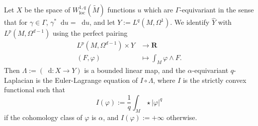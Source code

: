 \documentclass[reqno,11pt]{amsart}
\newcommand{\RR}{\mathbf{R}}
\newcommand*\dif{\mathop{}\!\mathrm{d}}
\newcommand{\loc}{\mathrm{loc}}
\theoremstyle{definition}
\numberwithin{equation}{section}
\begin{document}
Let $X$ be the space of $W^{1, q}_\loc(\tilde M)$ functions $u$ which are $\Gamma$-equivariant in the sense that for $\gamma \in \Gamma$, $\gamma^* \dif u = \dif u$, and let $Y := L^q(M, \Omega^1)$.
We identify $\hat Y$ with $L^p(M, \Omega^{d - 1})$ using the perfect pairing 
\begin{align*}
	L^p(M, \Omega^{d - 1}) \times Y &\to \RR \\
	(F, \varphi) &\mapsto \int_M \varphi \wedge F.
\end{align*}
Then $\Lambda := (\dif: X \to Y)$ is a bounded linear map, and the $\alpha$-equivariant $q$-Laplacian is the Euler-Lagrange equation of $I \circ \Lambda$, where $I$ is the strictly convex functional such that
$$I(\varphi) := \frac{1}{q} \int_M \star |\varphi|^q$$
if the cohomology class of $\varphi$ is $\alpha$, and $I(\varphi) := +\infty$ otherwise.
\end{document}
